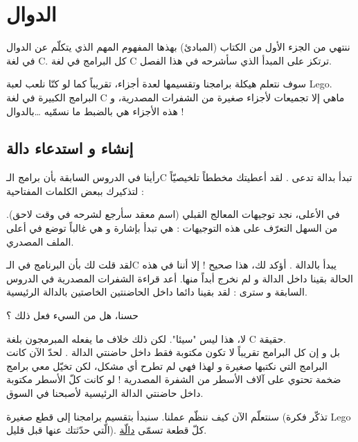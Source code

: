 \chapter{الدوال}

ننتهي من الجزء الأول من الكتاب (المبادئ) بهذها المفهوم المهم الذي يتكلّم عن الدوال في لغة
\textenglish{C}.
كل البرامج في لغة  
\textenglish{C}
ترتكز على المبدأ الذي سأشرحه في هذا الفصل.

سوف نتعلم هيكلة برامجنا وتقسيمها لعدة أجزاء، تقريباً كما لو كنّا نلعب لعبة
\textenglish{Lego}.\\
البرامج الكبيرة في لغة 
\textenglish{C}
ماهي إلا تجميعات لأجزاء صغيرة من الشفرات المصدرية، و هذه الأجزاء هي بالضبط ما نسمّيه \dots بالدوال !

\section{إنشاء و استدعاء دالة}

رأينا في الدروس السابقة بأن برامج الـ\textenglish{C}
تبدأ بدالة تدعى 
.
لقد أعطيتك مخططاً تلخيصيّاً لتذكيرك ببعض الكلمات المفتاحية :


في الأعلى، نجد توجيهات المعالج القبلي (اسم معقد سأرجع لشرحه في وقت لاحق). من السهل التعرّف على هذه التوجيهات : هي تبدأ بإشارة 
\InlineCode{\#}
و هي غالباً توضع في أعلى الملف المصدري.

لقد قلت لك بأن البرنامج في الـ\textenglish{C}
يبدأ بالدالة
.
 أؤكد لك، هذا صحيح ! إلا أننا في هذه الحالة بقينا داخل الدالة 
و لم نخرج أبداً منها. أعد قراءة الشفرات المصدرية في الدروس السابقة و سترى : لقد بقينا دائما داخل الحاضنتين الخاصتين بالدالة الرئيسية.

\begin{question}
حسنا، هل من السيء فعل ذلك ؟
\end{question}

لا، هذا ليس "سيئا". لكن ذلك خلاف ما يفعله المبرمجون بلغة
\textenglish{C}
حقيقة.\\
بل و إن كل البرامج تقريباً لا تكون مكتوبة فقط داخل  حاضنتي الدالة 
.
لحدّ الآن كانت البرامج التي نكتبها صغيرة و لهذا فهي لم تطرح أي مشكل، لكن تخيّل معي برامج ضخمة تحتوي على آلاف الأسطر من الشفرة المصدرية ! لو كانت كلّ الأسطر مكتوبة داخل حاضنتي الدالة الرئيسية لأصبحنا في السوق.

سنتعلّم الآن كيف ننظّم عملنا. سنبدأ بتقسيم برامجنا إلى قطع صغيرة (تذكّر فكرة
\textenglish{Lego}
الّتي حدّثتك عنها قبل قليل). كلّ قطعة تسمّى
\underline{دالّة}.

